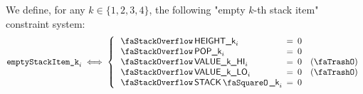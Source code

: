 We define, for any $k\in\{1,2,3,4\}$, the following "empty $k$-th stack item" constraint system:
\[
	\emptyStackItem{k}_{i}
	\iff
	\left\{
	\begin{array}{lclr}
		\stackItemHeight{k}_{i} & \!\!\! = \!\!\! & 0 \\
		\stackItemPop{k}_{i}    & \!\!\! = \!\!\! & 0 \\
		\stackItemValHi{k}_{i}  & \!\!\! = \!\!\! & 0  & (\trash) \\
		\stackItemValLo{k}_{i}  & \!\!\! = \!\!\! & 0  & (\trash) \\
		\stackItemStamp{k}_{i}  & \!\!\! = \!\!\! & 0 \\
	\end{array}
	\right.
\]
